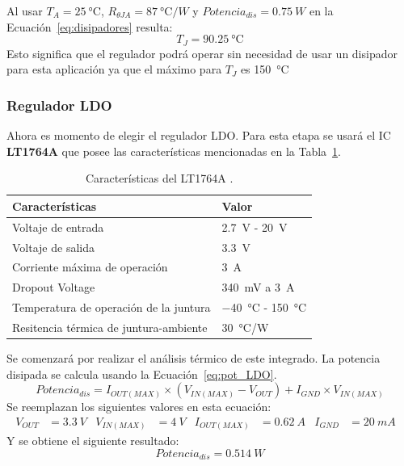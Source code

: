 Al usar $T_A=\SI{25}{\celsius}$,  $R_{\theta JA}=\SI{87}{\celsius/W}$ y $Potencia_{dis}=\SI{0.75}{W}$ en  la Ecuación~\ref{eq:disipadores} resulta:
$$T_J=\SI{90.25}{\celsius}$$
Esto significa que el regulador podrá operar sin necesidad de usar un disipador para esta aplicación ya que el máximo para $T_J$ es \SI{150}{\celsius}


\subsubsection{Regulador LDO}


Ahora es momento de elegir el regulador LDO. Para esta etapa se usará el IC \textbf{LT1764A} que posee las características mencionadas en la Tabla~\ref{diag:LDO}.

\bgroup
\def\arraystretch{1.5}%
\begin{table}[htbp!]
\centering
\caption[Características del LT1764A]{Características del LT1764A \cite{LT1764A}.}
\begin{tabular}{@{}ll@{}}
\toprule
Características & Valor \\ \midrule
Voltaje de entrada & \SI{2.7}{V} - \SI{20}{V} \\
Voltaje de salida & \SI{3.3}{V} \\
Corriente máxima de operación & \SI{3}{A} \\
Dropout Voltage & \SI{340}{mV} a \SI{3}{A} \\
Temperatura de operación de la juntura & \SI{-40}{\celsius} - \SI{150}{\celsius}\\
Resitencia térmica de juntura-ambiente & \SI{30}{\celsius/W}\\\bottomrule
\end{tabular}
\label{diag:LDO}
\end{table}
\egroup



Se comenzará por realizar el análisis térmico de este integrado. La potencia disipada se calcula usando la Ecuación~\ref{eq:pot_LDO}.
\begin{equation}
    Potencia_{dis}=I_{OUT(MAX)}\times(V_{IN(MAX)}-V_{OUT})+I_{GND}\times V_{IN(MAX)} \label{eq:pot_LDO}
\end{equation}
Se reemplazan los siguientes valores en esta ecuación:
\begin{align*}
    V_{OUT}&=\SI{3.3}{V}&
    V_{IN(MAX)}&=\SI{4}{V}&
    I_{OUT(MAX)}&=\SI{0.62}{A}&
    I_{GND}&=\SI{20}{mA}&
\end{align*}
Y se obtiene el siguiente resultado:
$$ Potencia_{dis}=\SI{0.514}{W}$$


